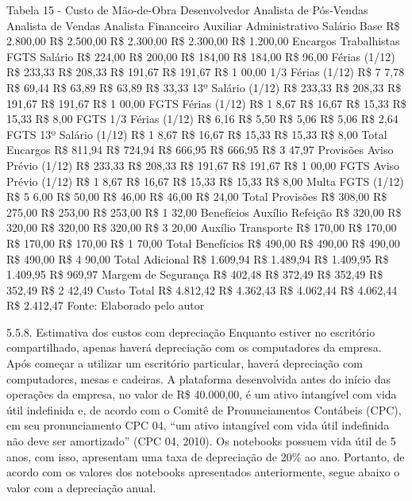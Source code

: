 Tabela 15 - Custo de Mão-de-Obra 
Desenvolvedor	Analista de Pós-Vendas	Analista de Vendas	Analista Financeiro	Auxiliar Administrativo
Salário Base	R\$     2.800,00	R\$  2.500,00	R\$  2.300,00	R\$  2.300,00	R\$   1.200,00
Encargos Trabalhistas		
FGTS Salário	R\$        224,00	R\$     200,00	R\$     184,00	R\$     184,00	R\$       96,00
Férias (1/12)	R\$        233,33	R\$     208,33	R\$     191,67	R\$     191,67	R\$     1 00,00
1/3 Férias (1/12)	R\$         7 7,78	R\$       69,44	R\$       63,89	R\$       63,89	R\$       33,33
13º Salário (1/12)	R\$        233,33	R\$     208,33	R\$     191,67	R\$     191,67	R\$     1 00,00
FGTS Férias (1/12)	R\$         1 8,67	R\$       16,67	R\$       15,33	R\$       15,33	R\$         8,00
FGTS 1/3 Férias (1/12)	R\$           6,16	R\$        5,50	R\$        5,06	R\$        5,06	R\$         2,64
FGTS 13º Salário (1/12)	R\$         1 8,67	R\$       16,67	R\$       15,33	R\$       15,33	R\$         8,00
Total Encargos	R\$        811,94	R\$     724,94	R\$     666,95	R\$     666,95	R\$     3 47,97
Provisões		
Aviso Prévio (1/12)	R\$        233,33	R\$     208,33	R\$     191,67	R\$     191,67	R\$     1 00,00
FGTS Aviso Prévio (1/12)	R\$         1 8,67	R\$       16,67	R\$       15,33	R\$       15,33	R\$         8,00
Multa FGTS (1/12)	R\$         5 6,00	R\$       50,00	R\$       46,00	R\$       46,00	R\$       24,00
Total Provisões	R\$        308,00	R\$     275,00	R\$     253,00	R\$     253,00	R\$     1 32,00
Benefícios		
Auxílio Refeição	R\$        320,00	R\$     320,00	R\$     320,00	R\$     320,00	R\$     3 20,00
Auxílio Transporte	R\$        170,00	R\$     170,00	R\$     170,00	R\$     170,00	R\$     1 70,00
Total Benefícios	R\$        490,00	R\$     490,00	R\$     490,00	R\$     490,00	R\$     4 90,00
Total Adicional	R\$     1.609,94	R\$  1.489,94	R\$  1.409,95	R\$  1.409,95	R\$      969,97
Margem de Segurança	R\$        402,48	R\$     372,49	R\$     352,49	R\$     352,49	R\$     2 42,49
Custo Total	R\$     4.812,42	R\$  4.362,43	R\$  4.062,44	R\$  4.062,44	R\$   2.412,47
Fonte: Elaborado pelo autor 

5.5.8. Estimativa dos custos com depreciação 
Enquanto estiver no escritório compartilhado, apenas haverá depreciação com os computadores da empresa. Após começar a utilizar um escritório particular, haverá depreciação com computadores, mesas e cadeiras. A plataforma desenvolvida antes do início das operações da empresa, no valor de R\$ 40.000,00, é um ativo intangível com vida útil indefinida e, de acordo com o Comitê de Pronunciamentos Contábeis (CPC), em seu pronunciamento CPC 04, “um ativo intangível com vida útil indefinida não deve ser amortizado” (CPC 04, 2010). 
Os notebooks possuem vida útil de 5 anos, com isso, apresentam uma taxa de depreciação de 20\% ao ano. Portanto, de acordo com os valores dos notebooks apresentados anteriormente, segue abaixo o valor com a depreciação anual. 

